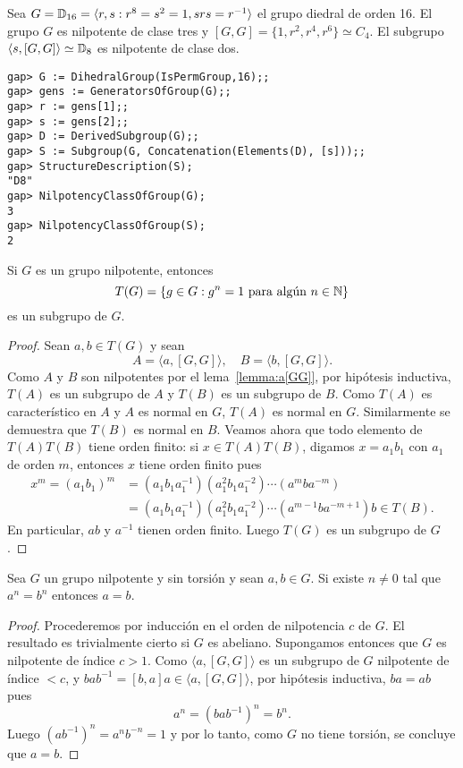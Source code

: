 \begin{example}
	Sea $G=\mathbb{D}_{16}=\langle r,s:r^{8}=s^2=1,srs=r^{-1}\rangle$ el grupo diedral
	de orden 16. El grupo $G$ es nilpotente de clase tres
	y $[G,G]=\{1,r^2,r^4,r^6\}\simeq C_4$. El subgrupo $\langle
	s,[G,G]\rangle\simeq\mathbb{D}_8$ es nilpotente de clase dos.

	\begin{lstlisting}
gap> G := DihedralGroup(IsPermGroup,16);;
gap> gens := GeneratorsOfGroup(G);;
gap> r := gens[1];;
gap> s := gens[2];;
gap> D := DerivedSubgroup(G);;
gap> S := Subgroup(G, Concatenation(Elements(D), [s]));;
gap> StructureDescription(S);
"D8"
gap> NilpotencyClassOfGroup(G);
3
gap> NilpotencyClassOfGroup(S);
2
	\end{lstlisting}
\end{example}

\begin{theorem}
	\label{theorem:T(nilpotent)}
	Si $G$ es un grupo nilpotente, entonces
	\[
	T(G)=\{g\in G:g^n=1\text{ para algún $n\in\mathbb{N}$}\}
	\]
	es un subgrupo de $G$. 
\end{theorem}

\begin{proof}
	Sean $a,b\in T(G)$ y sean
	\[
		A=\langle a,[G,G]\rangle,\quad
		B=\langle b,[G,G]\rangle.
	\]
	Como $A$ y $B$ son nilpotentes por el lema~\ref{lemma:a[GG]}, por hipótesis
	inductiva, $T(A)$ es un subgrupo de $A$ y $T(B)$ es un subgrupo de $B$.
	Como $T(A)$ es característico en $A$ y $A$ es normal en $G$, $T(A)$ es
	normal en $G$. Similarmente se demuestra que $T(B)$ es normal en $B$.  
	Veamos ahora que todo elemento de $T(A)T(B)$ tiene orden finito: si
	$x\in T(A)T(B)$, digamos $x=a_1b_1$ con
	$a_1$ de orden $m$, entonces $x$ tiene orden finito pues 
	\begin{align*}
	x^m=(a_1b_1)^m&=(a_1b_1a_1^{-1})(a_1^2b_1a_1^{-2})\cdots (a^m b a^{-m})\\
	&=(a_1b_1a_1^{-1})(a_1^2b_1a_1^{-2})\cdots (a^{m-1} b a^{-m+1})b\in T(B).
	\end{align*}
	En particular, $ab$ y $a^{-1}$ tienen orden finito. Luego $T(G)$ es un
	subgrupo de $G$.
\end{proof}

\begin{theorem}
	\label{theorem:a=b}
	Sea $G$ un grupo nilpotente y sin torsión y sean $a,b\in G$. Si existe
	$n\ne 0$ tal que $a^n=b^n$ entonces $a=b$.
\end{theorem}

\begin{proof}
	Procederemos por inducción en el orden de nilpotencia $c$ de $G$. El
	resultado es trivialmente cierto si $G$ es abeliano. Supongamos entonces
	que $G$ es nilpotente de índice $c>1$. Como $\langle a,[G,G]\rangle$ es un
	subgrupo de $G$ nilpotente de índice $<c$, y $bab^{-1}=[b,a]a\in \langle
	a,[G,G]\rangle$, por hipótesis inductiva, $ba=ab$ pues 
	\[
		a^n=(bab^{-1})^n=b^n.
	\]
	Luego $(ab^{-1})^n=a^nb^{-n}=1$ y por lo tanto, como $G$ no tiene torsión,
	se concluye que $a=b$.
\end{proof}

